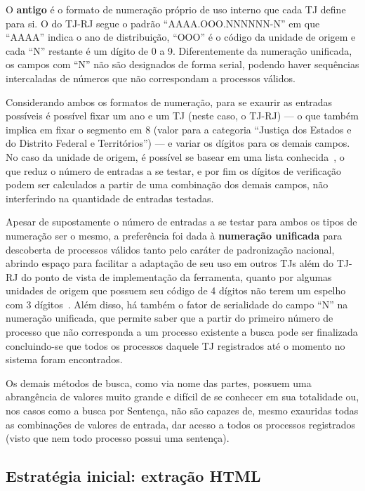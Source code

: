 O \textbf{antigo} é o formato de numeração próprio de uso interno que cada TJ
define para si. O do TJ-RJ segue o padrão ``AAAA.OOO.NNNNNN-N'' em que ``AAAA''
indica o ano de distribuição, ``OOO'' é o código da unidade de origem e cada
``N'' restante é um dígito de 0 a 9. Diferentemente da numeração unificada, os
campos com ``N'' não são designados de forma serial, podendo haver sequências
intercaladas de números que não correspondam a processos válidos.

Considerando ambos os formatos de numeração, para se exaurir as entradas
possíveis é possível fixar um ano e um TJ (neste caso, o TJ-RJ) --- o que
também implica em fixar o segmento em 8 (valor para a categoria ``Justiça dos
Estados e do Distrito Federal e Territórios'') --- e variar os dígitos para os
demais campos. No caso da unidade de origem, é possível se basear em uma lista
conhecida~\cite{spec:tjrj-codigos-unidades-de-origem}, o que reduz o número de
entradas a se testar, e por fim os dígitos de verificação podem ser calculados
a partir de uma combinação dos demais campos, não interferindo na quantidade de
entradas testadas.

Apesar de supostamente o número de entradas a se testar para ambos os tipos de
numeração ser o mesmo, a preferência foi dada à \textbf{numeração unificada}
para descoberta de processos válidos tanto pelo caráter de padronização
nacional, abrindo espaço para facilitar a adaptação de seu uso em outros TJs
além do TJ-RJ do ponto de vista de implementação da ferramenta, quanto por
algumas unidades de origem que possuem seu código de 4 dígitos não terem um
espelho com 3 dígitos~\cite{spec:tjrj-codigos-unidades-de-origem}. Além disso,
há também o fator de serialidade do campo ``N'' na numeração unificada, que
permite saber que a partir do primeiro número de processo que não corresponda a
um processo existente a busca pode ser finalizada concluindo-se que todos os
processos daquele TJ registrados até o momento no sistema foram encontrados.

Os demais métodos de busca, como via nome das partes, possuem uma abrangência
de valores muito grande e difícil de se conhecer em sua totalidade ou, nos
casos como a busca por Sentença, não são capazes de, mesmo exauridas todas as
combinações de valores de entrada, dar acesso a todos os processos registrados
(visto que nem todo processo possui uma sentença).

\subsection{Estratégia inicial: extração HTML}

